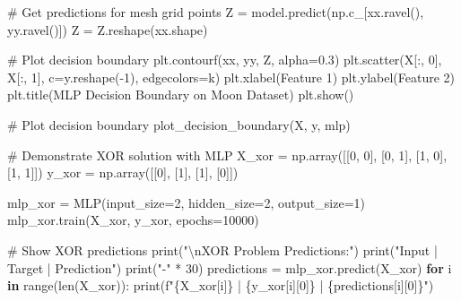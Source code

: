 \documentclass[
  letterpaper,
  DIV=11,
  numbers=noendperiod]{scrreprt}
\newenvironment{Shaded}{\begin{snugshade}}{\end{snugshade}}
\newcommand{\BuiltInTok}[1]{\textcolor[rgb]{0.00,0.23,0.31}{#1}}
\newcommand{\CharTok}[1]{\textcolor[rgb]{0.13,0.47,0.30}{#1}}
\newcommand{\CommentTok}[1]{\textcolor[rgb]{0.37,0.37,0.37}{#1}}
\newcommand{\ControlFlowTok}[1]{\textcolor[rgb]{0.00,0.23,0.31}{\textbf{#1}}}
\newcommand{\DecValTok}[1]{\textcolor[rgb]{0.68,0.00,0.00}{#1}}
\newcommand{\FloatTok}[1]{\textcolor[rgb]{0.68,0.00,0.00}{#1}}
\newcommand{\KeywordTok}[1]{\textcolor[rgb]{0.00,0.23,0.31}{\textbf{#1}}}
\newcommand{\NormalTok}[1]{\textcolor[rgb]{0.00,0.23,0.31}{#1}}
\newcommand{\OperatorTok}[1]{\textcolor[rgb]{0.37,0.37,0.37}{#1}}
\newcommand{\SpecialCharTok}[1]{\textcolor[rgb]{0.37,0.37,0.37}{#1}}
\newcommand{\SpecialStringTok}[1]{\textcolor[rgb]{0.13,0.47,0.30}{#1}}
\newcommand{\StringTok}[1]{\textcolor[rgb]{0.13,0.47,0.30}{#1}}
\begin{document}
\begin{Shaded}
\begin{Highlighting}[]
    \CommentTok{\# Get predictions for mesh grid points}
\NormalTok{    Z }\OperatorTok{=}\NormalTok{ model.predict(np.c\_[xx.ravel(), yy.ravel()])}
\NormalTok{    Z }\OperatorTok{=}\NormalTok{ Z.reshape(xx.shape)}
    
    \CommentTok{\# Plot decision boundary}
\NormalTok{    plt.contourf(xx, yy, Z, alpha}\OperatorTok{=}\FloatTok{0.3}\NormalTok{)}
\NormalTok{    plt.scatter(X[:, }\DecValTok{0}\NormalTok{], X[:, }\DecValTok{1}\NormalTok{], c}\OperatorTok{=}\NormalTok{y.reshape(}\OperatorTok{{-}}\DecValTok{1}\NormalTok{), edgecolors}\OperatorTok{=}\StringTok{\textquotesingle{}k\textquotesingle{}}\NormalTok{)}
\NormalTok{    plt.xlabel(}\StringTok{\textquotesingle{}Feature 1\textquotesingle{}}\NormalTok{)}
\NormalTok{    plt.ylabel(}\StringTok{\textquotesingle{}Feature 2\textquotesingle{}}\NormalTok{)}
\NormalTok{    plt.title(}\StringTok{\textquotesingle{}MLP Decision Boundary on Moon Dataset\textquotesingle{}}\NormalTok{)}
\NormalTok{    plt.show()}

\CommentTok{\# Plot decision boundary}
\NormalTok{plot\_decision\_boundary(X, y, mlp)}

\CommentTok{\# Demonstrate XOR solution with MLP}
\NormalTok{X\_xor }\OperatorTok{=}\NormalTok{ np.array([[}\DecValTok{0}\NormalTok{, }\DecValTok{0}\NormalTok{], [}\DecValTok{0}\NormalTok{, }\DecValTok{1}\NormalTok{], [}\DecValTok{1}\NormalTok{, }\DecValTok{0}\NormalTok{], [}\DecValTok{1}\NormalTok{, }\DecValTok{1}\NormalTok{]])}
\NormalTok{y\_xor }\OperatorTok{=}\NormalTok{ np.array([[}\DecValTok{0}\NormalTok{], [}\DecValTok{1}\NormalTok{], [}\DecValTok{1}\NormalTok{], [}\DecValTok{0}\NormalTok{]])}

\NormalTok{mlp\_xor }\OperatorTok{=}\NormalTok{ MLP(input\_size}\OperatorTok{=}\DecValTok{2}\NormalTok{, hidden\_size}\OperatorTok{=}\DecValTok{2}\NormalTok{, output\_size}\OperatorTok{=}\DecValTok{1}\NormalTok{)}
\NormalTok{mlp\_xor.train(X\_xor, y\_xor, epochs}\OperatorTok{=}\DecValTok{10000}\NormalTok{)}

\CommentTok{\# Show XOR predictions}
\BuiltInTok{print}\NormalTok{(}\StringTok{"}\CharTok{\textbackslash{}n}\StringTok{XOR Problem Predictions:"}\NormalTok{)}
\BuiltInTok{print}\NormalTok{(}\StringTok{"Input | Target | Prediction"}\NormalTok{)}
\BuiltInTok{print}\NormalTok{(}\StringTok{"{-}"} \OperatorTok{*} \DecValTok{30}\NormalTok{)}
\NormalTok{predictions }\OperatorTok{=}\NormalTok{ mlp\_xor.predict(X\_xor)}
\ControlFlowTok{for}\NormalTok{ i }\KeywordTok{in} \BuiltInTok{range}\NormalTok{(}\BuiltInTok{len}\NormalTok{(X\_xor)):}
    \BuiltInTok{print}\NormalTok{(}\SpecialStringTok{f"}\SpecialCharTok{\{}\NormalTok{X\_xor[i]}\SpecialCharTok{\}}\SpecialStringTok{ | }\SpecialCharTok{\{}\NormalTok{y\_xor[i][}\DecValTok{0}\NormalTok{]}\SpecialCharTok{\}}\SpecialStringTok{      | }\SpecialCharTok{\{}\NormalTok{predictions[i][}\DecValTok{0}\NormalTok{]}\SpecialCharTok{\}}\SpecialStringTok{"}\NormalTok{)}
\end{Highlighting}
\end{Shaded}
\end{document}
